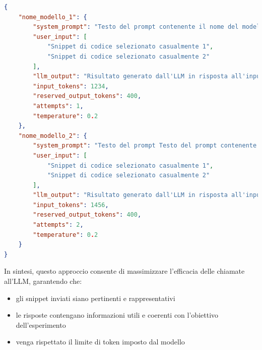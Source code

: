 \documentclass{article}
\begin{document}
\begin{lstlisting}[language=json, caption={Esempio di struttura JSON nella risposta dell'LLM}, label={lst:json-example}]
{
    "nome_modello_1": {
        "system_prompt": "Testo del prompt contenente il nome del modello 1",
        "user_input": [
            "Snippet di codice selezionato casualmente 1",
            "Snippet di codice selezionato casualmente 2"
        ],
        "llm_output": "Risultato generato dall'LLM in risposta all'input fornito",
        "input_tokens": 1234,
        "reserved_output_tokens": 400,
        "attempts": 1,
        "temperature": 0.2
    },
    "nome_modello_2": {
        "system_prompt": "Testo del prompt Testo del prompt contenente il nome del modello 2",
        "user_input": [
            "Snippet di codice selezionato casualmente 1",
            "Snippet di codice selezionato casualmente 2"
        ],
        "llm_output": "Risultato generato dall'LLM in risposta all'input fornito",
        "input_tokens": 1456,
        "reserved_output_tokens": 400,
        "attempts": 2,
        "temperature": 0.2
    }
}
\end{lstlisting}
In sintesi, questo approccio consente di massimizzare l’efficacia delle chiamate all’LLM, garantendo che:
\begin{itemize}
    \item gli snippet inviati siano pertinenti e rappresentativi
    \item le risposte contengano informazioni utili e coerenti con l’obiettivo dell’esperimento
    \item venga rispettato il limite di token imposto dal modello
\end{itemize}
\end{document}

